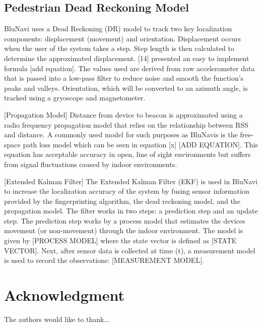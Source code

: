 \documentclass[conference]{IEEEtran}
\begin{document}
\subsection{Pedestrian Dead Reckoning Model}
BluNavi uses a Dead Reckoning (DR) model to track two key localization components: displacement (movement) and orientation. Displacement occurs when the user of the system takes a step. Step length is then calculated to determine the approximated displacement. [14] presented an easy to implement formula [add equation]. The values used are derived from raw accelerometer data that is passed into a low-pass filter to reduce noise and smooth the function’s peaks and valleys. Orientation, which will be converted to an azimuth angle, is tracked using a gryoscope and magnetometer.

[Propagation Model]
Distance from device to beacon is approximated using a radio frequency propagation model that relies on the relationship between RSS and distance. A commonly used model for such purposes as BluNavis is the free-space path loss model which can be seen in equation [x] [ADD EQUATION]. This equation has acceptable accuracy in open, line of sight environments but suffers from signal fluctuations caused by indoor environments.

[Extended Kalman Filter]
The Extended Kalman Filter (EKF) is used in BluNavi to increase the localization accuracy of the system by fusing sensor information provided by the fingerprinting algorithm, the dead reckoning model, and the propagation model. The filter works in two steps: a prediction step and an update step. The prediction step works by a process model that estimates the devices movement (or non-movement) through the indoor environment. The model is given by [PROCESS MODEL] where the state vector is defined as [STATE VECTOR]. Next, after sensor data is collected at time (t), a measurement model is used to record the observations: [MEASUREMENT MODEL].


\section*{Acknowledgment}


The authors would like to thank...








\end{document}
